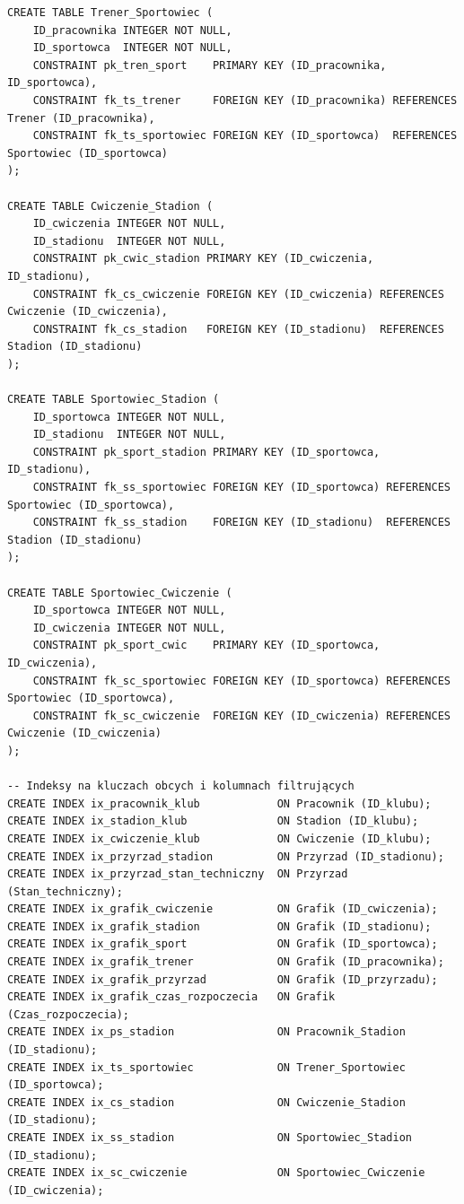 \documentclass[11pt,a4paper]{article}
\begin{document}
\begin{lstlisting}[basicstyle=\ttfamily\footnotesize, caption={Poprawiony skrypt SQL tworzący strukturę bazy danych}]
CREATE TABLE Trener_Sportowiec (
    ID_pracownika INTEGER NOT NULL,
    ID_sportowca  INTEGER NOT NULL,
    CONSTRAINT pk_tren_sport    PRIMARY KEY (ID_pracownika, ID_sportowca),
    CONSTRAINT fk_ts_trener     FOREIGN KEY (ID_pracownika) REFERENCES Trener (ID_pracownika),
    CONSTRAINT fk_ts_sportowiec FOREIGN KEY (ID_sportowca)  REFERENCES Sportowiec (ID_sportowca)
);

CREATE TABLE Cwiczenie_Stadion (
    ID_cwiczenia INTEGER NOT NULL,
    ID_stadionu  INTEGER NOT NULL,
    CONSTRAINT pk_cwic_stadion PRIMARY KEY (ID_cwiczenia, ID_stadionu),
    CONSTRAINT fk_cs_cwiczenie FOREIGN KEY (ID_cwiczenia) REFERENCES Cwiczenie (ID_cwiczenia),
    CONSTRAINT fk_cs_stadion   FOREIGN KEY (ID_stadionu)  REFERENCES Stadion (ID_stadionu)
);

CREATE TABLE Sportowiec_Stadion (
    ID_sportowca INTEGER NOT NULL,
    ID_stadionu  INTEGER NOT NULL,
    CONSTRAINT pk_sport_stadion PRIMARY KEY (ID_sportowca, ID_stadionu),
    CONSTRAINT fk_ss_sportowiec FOREIGN KEY (ID_sportowca) REFERENCES Sportowiec (ID_sportowca),
    CONSTRAINT fk_ss_stadion    FOREIGN KEY (ID_stadionu)  REFERENCES Stadion (ID_stadionu)
);

CREATE TABLE Sportowiec_Cwiczenie (
    ID_sportowca INTEGER NOT NULL,
    ID_cwiczenia INTEGER NOT NULL,
    CONSTRAINT pk_sport_cwic    PRIMARY KEY (ID_sportowca, ID_cwiczenia),
    CONSTRAINT fk_sc_sportowiec FOREIGN KEY (ID_sportowca) REFERENCES Sportowiec (ID_sportowca),
    CONSTRAINT fk_sc_cwiczenie  FOREIGN KEY (ID_cwiczenia) REFERENCES Cwiczenie (ID_cwiczenia)
);

-- Indeksy na kluczach obcych i kolumnach filtrujących
CREATE INDEX ix_pracownik_klub            ON Pracownik (ID_klubu);
CREATE INDEX ix_stadion_klub              ON Stadion (ID_klubu);
CREATE INDEX ix_cwiczenie_klub            ON Cwiczenie (ID_klubu);
CREATE INDEX ix_przyrzad_stadion          ON Przyrzad (ID_stadionu);
CREATE INDEX ix_przyrzad_stan_techniczny  ON Przyrzad (Stan_techniczny);
CREATE INDEX ix_grafik_cwiczenie          ON Grafik (ID_cwiczenia);
CREATE INDEX ix_grafik_stadion            ON Grafik (ID_stadionu);
CREATE INDEX ix_grafik_sport              ON Grafik (ID_sportowca);
CREATE INDEX ix_grafik_trener             ON Grafik (ID_pracownika);
CREATE INDEX ix_grafik_przyrzad           ON Grafik (ID_przyrzadu);
CREATE INDEX ix_grafik_czas_rozpoczecia   ON Grafik (Czas_rozpoczecia);
CREATE INDEX ix_ps_stadion                ON Pracownik_Stadion (ID_stadionu);
CREATE INDEX ix_ts_sportowiec             ON Trener_Sportowiec (ID_sportowca);
CREATE INDEX ix_cs_stadion                ON Cwiczenie_Stadion (ID_stadionu);
CREATE INDEX ix_ss_stadion                ON Sportowiec_Stadion (ID_stadionu);
CREATE INDEX ix_sc_cwiczenie              ON Sportowiec_Cwiczenie (ID_cwiczenia);


\end{lstlisting}
\end{document}
